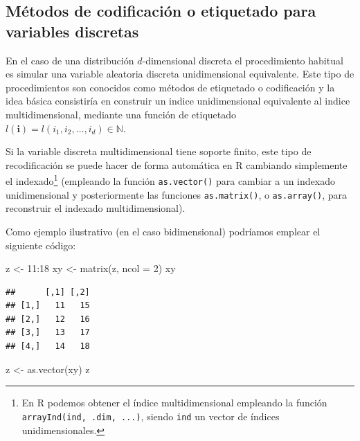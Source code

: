 \documentclass[
]{book}
\newenvironment{Shaded}{\begin{snugshade}}{\end{snugshade}}
\newcommand{\AttributeTok}[1]{\textcolor[rgb]{0.77,0.63,0.00}{#1}}
\newcommand{\DecValTok}[1]{\textcolor[rgb]{0.00,0.00,0.81}{#1}}
\newcommand{\FunctionTok}[1]{\textcolor[rgb]{0.00,0.00,0.00}{#1}}
\newcommand{\NormalTok}[1]{#1}
\newcommand{\OtherTok}[1]{\textcolor[rgb]{0.56,0.35,0.01}{#1}}
\newcommand{\SpecialCharTok}[1]{\textcolor[rgb]{0.00,0.00,0.00}{#1}}
\theoremstyle{break}
\theoremstyle{definition}
\theoremstyle{definition}
\theoremstyle{definition}
\theoremstyle{definition}
\theoremstyle{remark}
\begin{document}
\hypertarget{muxe9todos-de-codificaciuxf3n-o-etiquetado-para-variables-discretas}{%
\subsection{Métodos de codificación o etiquetado para variables discretas}\label{muxe9todos-de-codificaciuxf3n-o-etiquetado-para-variables-discretas}}

En el caso de una distribución \(d\)-dimensional discreta el procedimiento habitual es simular una variable aleatoria discreta unidimensional equivalente.
Este tipo de procedimientos son conocidos como métodos de etiquetado o codificación y la idea básica consistiría en construir un
indice unidimensional equivalente al indice multidimensional,
mediante una función de etiquetado
\(l(\mathbf{i}) = l\left(i_1, i_2, \ldots,i_d \right) \in \mathbb{N}\).

Si la variable discreta multidimensional tiene soporte finito, este tipo de recodificación se puede hacer de forma automática en R cambiando simplemente el indexado\footnote{En R podemos obtener el índice multidimensional empleando la función \texttt{arrayInd(ind,\ .dim,\ ...)}, siendo \texttt{ind} un vector de índices unidimensionales.} (empleando la función \texttt{as.vector()} para cambiar a un indexado unidimensional y posteriormente las funciones \texttt{as.matrix()}, o \texttt{as.array()}, para reconstruir el indexado multidimensional).

Como ejemplo ilustrativo (en el caso bidimensional) podríamos emplear el siguiente código:

\begin{Shaded}
\begin{Highlighting}[]
\NormalTok{z }\OtherTok{\textless{}{-}} \DecValTok{11}\SpecialCharTok{:}\DecValTok{18}
\NormalTok{xy }\OtherTok{\textless{}{-}} \FunctionTok{matrix}\NormalTok{(z, }\AttributeTok{ncol =} \DecValTok{2}\NormalTok{)}
\NormalTok{xy}
\end{Highlighting}
\end{Shaded}

\begin{verbatim}
##      [,1] [,2]
## [1,]   11   15
## [2,]   12   16
## [3,]   13   17
## [4,]   14   18
\end{verbatim}

\begin{Shaded}
\begin{Highlighting}[]
\NormalTok{z }\OtherTok{\textless{}{-}} \FunctionTok{as.vector}\NormalTok{(xy)}
\NormalTok{z}
\end{Highlighting}
\end{Shaded}
\end{document}
